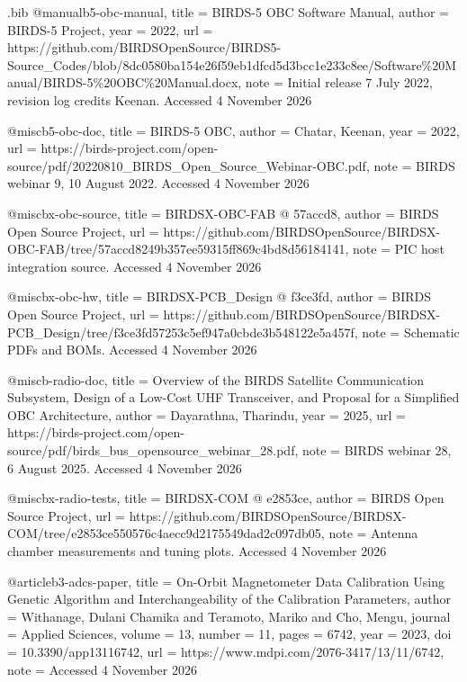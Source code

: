 \begin{filecontents*}[overwrite]{\jobname.bib}
@manual{b5-obc-manual,
  title = {{BIRDS-5 OBC Software Manual}},
  author = {{BIRDS-5 Project}},
  year = {2022},
  url = {https://github.com/BIRDSOpenSource/BIRDS5-Source_Codes/blob/8dc0580ba154e26f59eb1dfcd5d3bcc1e233c8ee/Software\%20Manual/BIRDS-5\%20OBC\%20Manual.docx},
  note = {Initial release 7 July 2022, revision log credits Keenan. Accessed 4 November 2026}
}

@misc{b5-obc-doc,
  title = {{BIRDS-5 OBC}},
  author = {Chatar, Keenan},
  year = {2022},
  url = {https://birds-project.com/open-source/pdf/20220810_BIRDS_Open_Source_Webinar-OBC.pdf},
  note = {BIRDS webinar 9, 10 August 2022. Accessed 4 November 2026}
}

@misc{bx-obc-source,
  title = {{BIRDSX-\allowbreak{}OBC-\allowbreak{}FAB @ 57accd8}},
  author = {{BIRDS Open Source Project}},
  url = {https://github.com/BIRDSOpenSource/BIRDSX-OBC-FAB/tree/57accd8249b357ee59315ff869c4bd8d56184141},
  note = {PIC host integration source. Accessed 4 November 2026}
}

@misc{bx-obc-hw,
  title = {{BIRDSX-\allowbreak{}PCB\_\allowbreak{}Design @ f3ce3fd}},
  author = {{BIRDS Open Source Project}},
  url = {https://github.com/BIRDSOpenSource/BIRDSX-PCB_Design/tree/f3ce3fd57253c5ef947a0cbde3b548122e5a457f},
  note = {Schematic PDFs and BOMs. Accessed 4 November 2026}
}

@misc{b-radio-doc,
  title = {{Overview of the BIRDS Satellite Communication Subsystem, Design of a Low-Cost UHF Transceiver, and Proposal for a Simplified OBC Architecture}},
  author = {Dayarathna, Tharindu},
  year = {2025},
  url = {https://birds-project.com/open-source/pdf/birds_bus_opensource_webinar_28.pdf},
  note = {BIRDS webinar 28, 6 August 2025. Accessed 4 November 2026}
}

@misc{bx-radio-tests,
  title = {{BIRDSX-\allowbreak{}COM @ e2853ce}},
  author = {{BIRDS Open Source Project}},
  url = {https://github.com/BIRDSOpenSource/BIRDSX-COM/tree/e2853ce550576c4aecc9d2175549dad2c097db05},
  note = {Antenna chamber measurements and tuning plots. Accessed 4 November 2026}
}

@article{b3-adcs-paper,
  title = {{On-Orbit Magnetometer Data Calibration Using Genetic Algorithm and Interchangeability of the Calibration Parameters}},
  author = {Withanage, Dulani Chamika and Teramoto, Mariko and Cho, Mengu},
  journal = {Applied Sciences},
  volume = {13},
  number = {11},
  pages = {6742},
  year = {2023},
  doi = {10.3390/app13116742},
  url = {https://www.mdpi.com/2076-3417/13/11/6742},
  note = {Accessed 4 November 2026}
}


\end{filecontents*}
